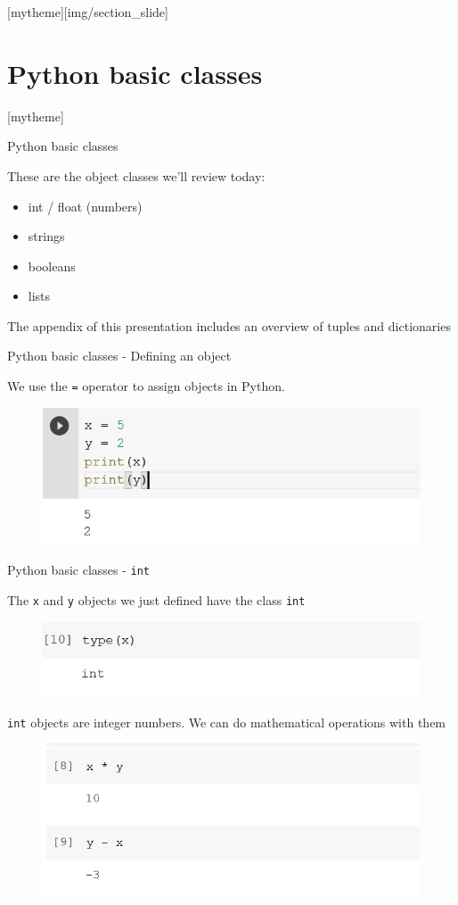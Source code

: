 \documentclass[aspectratio=169]{beamer}
\newcommand{\sectionpic}[2]{
	\setbeamertemplate{section page}[mytheme][#2]
	\section{#1}
	\setbeamertemplate{section page}[mytheme]
}
\begin{document}
\sectionpic{Python basic classes}{img/section_slide}

\begin{frame}{Python basic classes}

	These are the object classes we'll review today:

	\begin{itemize}
		\item int / float (numbers)
		\item strings
		\item booleans
		\item lists
	\end{itemize}

	The appendix of this presentation includes an overview of tuples and dictionaries

\end{frame}

\begin{frame}{Python basic classes - Defining an object}

	We use the \texttt{=} operator to assign objects in Python.

	\begin{figure}
		\centering
		\includegraphics[width=0.6\linewidth]{img/assignation.png}
	\end{figure}

\end{frame}

\begin{frame}{Python basic classes - \texttt{int}}

	The \texttt{x} and \texttt{y} objects we just defined have the class \texttt{int}

	\begin{figure}
		\centering
		\includegraphics[width=0.6\linewidth]{img/type_int.png}
	\end{figure}

	\texttt{int} objects are integer numbers. We can do mathematical operations with them
	\begin{figure}
		\centering
		\includegraphics[width=0.6\linewidth]{img/math_integers.png}
	\end{figure}

\end{frame}
\end{document}
